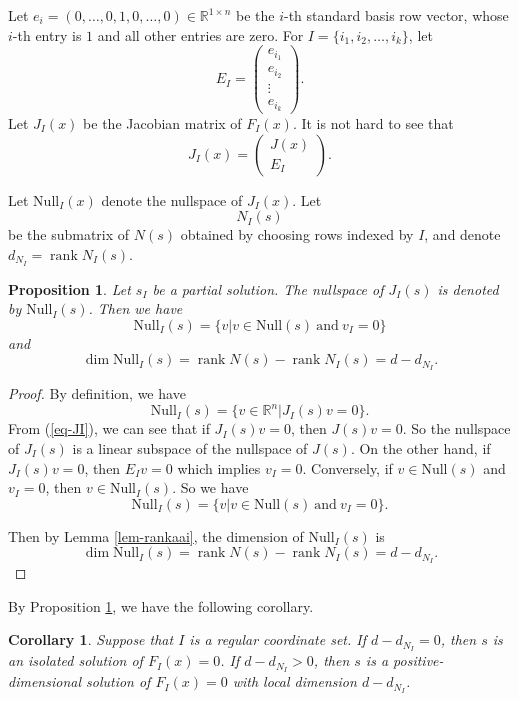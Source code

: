 \documentclass[reqno]{amsart}
\newtheorem{corollary}[theorem]{Corollary}
\newtheorem{proposition}[theorem]{Proposition}
\theoremstyle{definition}
\numberwithin{equation}{section}
\theoremstyle{remark}
\begin{document}



Let $e_i = (0,\ldots,0,1,0,\ldots,0) \in \mathbb{R}^{1\times n}$ be the $i$-th standard basis row vector, whose $i$-th entry is $1$ and all other entries are zero. For $I=\{i_1,i_2,\ldots,i_k\}$, let
$$E_I=\left(
\begin{array}{c}
e_{i_1}\\
e_{i_2}\\
\vdots\\
e_{i_k}
\end{array}
\right).
$$
Let $J_I(x)$ be the Jacobian matrix of $F_I(x)$. It is not hard to see that 
\begin{equation}\label{eq-JI}
 J_I(x)=\left(
\begin{array}{c}
J(x)\\
E_I
\end{array}
\right).
\end{equation}

Let $\mathrm{Null}_I(x)$ denote the nullspace of $J_I(x)$. Let 
\begin{equation}\label{eq-nis}
N_I(s) 
\end{equation}
be the submatrix of $N(s)$ obtained by choosing rows indexed by $I$, and denote $d_{N_I}=\operatorname{rank}N_I(s)$.

\begin{proposition}\label{prop-nbm}
Let $s_I$ be a partial solution.
The nullspace of $J_I(s)$ is denoted by $\mathrm{Null}_I(s)$.
Then we have
$$\mathrm{Null}_I(s)=\{v|v\in \mathrm{Null}(s)~\text{and}~v_I=0\}$$
and
$$\dim \mathrm{Null}_I(s)=\operatorname{rank}N(s)-\operatorname{rank}N_I(s)=d-d_{N_I}.$$
\end{proposition}
\begin{proof}
By definition,   we have
$$\mathrm{Null}_I(s)=\{v\in \mathbb{R}^n| J_I(s)v=0\}.$$
From (\ref{eq-JI}), we can see that
if $J_I(s)v=0$, then $J(s)v=0$. So the nullspace of $J_I(s)$ is a linear subspace of the nullspace of $J(s)$.
On the other hand, if $J_I(s)v=0$, then $E_I v=0$ which implies $v_I=0$.
Conversely, if $v\in \mathrm{Null}(s)$ and $v_I=0$, then $v\in \mathrm{Null}_I(s)$.
So we have 
$$\mathrm{Null}_I(s)=\{v|v\in \mathrm{Null}(s)~\text{and}~v_I=0\}.$$

Then by Lemma \ref{lem-rankaai}, the dimension of $\mathrm{Null}_I(s)$ is
$$\dim \mathrm{Null}_I(s)=\operatorname{rank}N(s)-\operatorname{rank}N_I(s)=d-d_{N_I}.$$
\end{proof}
By Proposition \ref{prop-nbm}, we have the following corollary.
\begin{corollary}\label{cor-ddi}
Suppose that $I$ is a regular coordinate set.
If $d-d_{N_I}=0$, then $s$ is an isolated solution of $F_I(x)=0$.
If $d-d_{N_I}>0$, then $s$ is a positive-dimensional solution of $F_I(x)=0$ with local dimension $d-d_{N_I}$.
\end{corollary}
\end{document}

